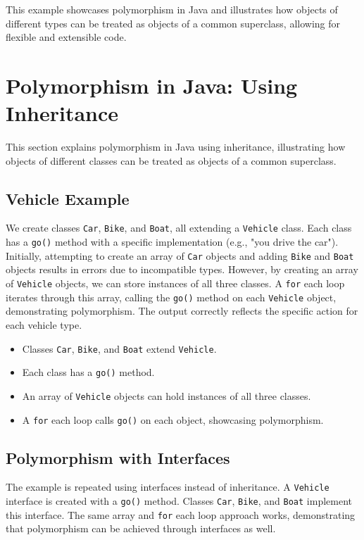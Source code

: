 \documentclass{article}
\begin{document}
This example showcases polymorphism in Java and illustrates how objects of different types can be treated as objects of a common superclass, allowing for flexible and extensible code.


\section{Polymorphism in Java: Using Inheritance}

This section explains polymorphism in Java using inheritance, illustrating how objects of different classes can be treated as objects of a common superclass.

\subsection{Vehicle Example}

We create classes \texttt{Car}, \texttt{Bike}, and \texttt{Boat}, all extending a \texttt{Vehicle} class. Each class has a \texttt{go()} method with a specific implementation (e.g., "you drive the car").  Initially, attempting to create an array of \texttt{Car} objects and adding \texttt{Bike} and \texttt{Boat} objects results in errors due to incompatible types.  However, by creating an array of \texttt{Vehicle} objects, we can store instances of all three classes. A \texttt{for} each loop iterates through this array, calling the \texttt{go()} method on each \texttt{Vehicle} object, demonstrating polymorphism.  The output correctly reflects the specific action for each vehicle type.

\begin{itemize}
\item Classes \texttt{Car}, \texttt{Bike}, and \texttt{Boat} extend \texttt{Vehicle}.
\item Each class has a \texttt{go()} method.
\item An array of \texttt{Vehicle} objects can hold instances of all three classes.
\item A \texttt{for} each loop calls \texttt{go()} on each object, showcasing polymorphism.
\end{itemize}

\subsection{Polymorphism with Interfaces}

The example is repeated using interfaces instead of inheritance.  A \texttt{Vehicle} interface is created with a \texttt{go()} method. Classes \texttt{Car}, \texttt{Bike}, and \texttt{Boat} implement this interface. The same array and \texttt{for} each loop approach works, demonstrating that polymorphism can be achieved through interfaces as well.
\end{document}
